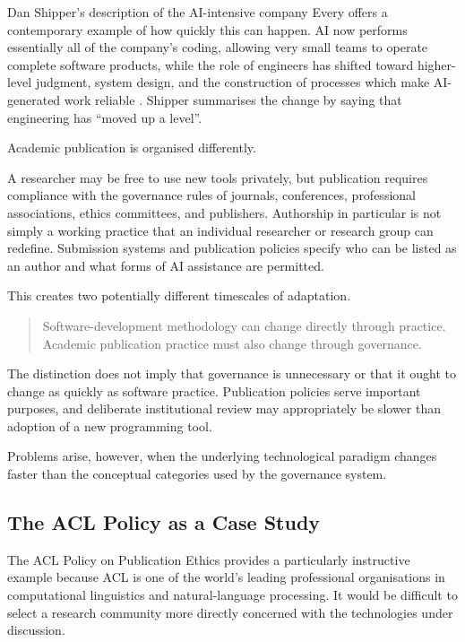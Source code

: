 Dan Shipper's description of the AI-intensive company Every offers a contemporary example of how quickly this can happen. AI now performs essentially all of the company's coding, allowing very small teams to operate complete software products, while the role of engineers has shifted toward higher-level judgment, system design, and the construction of processes which make AI-generated work reliable \citep{newton2026editorclone}. Shipper summarises the change by saying that engineering has ``moved up a level''.

Academic publication is organised differently.

A researcher may be free to use new tools privately, but publication requires compliance with the governance rules of journals, conferences, professional associations, ethics committees, and publishers. Authorship in particular is not simply a working practice that an individual researcher or research group can redefine. Submission systems and publication policies specify who can be listed as an author and what forms of AI assistance are permitted.

This creates two potentially different timescales of adaptation.

\begin{quote}
Software-development methodology can change directly through practice. Academic publication practice must also change through governance.
\end{quote}

The distinction does not imply that governance is unnecessary or that it ought to change as quickly as software practice. Publication policies serve important purposes, and deliberate institutional review may appropriately be slower than adoption of a new programming tool.

Problems arise, however, when the underlying technological paradigm changes faster than the conceptual categories used by the governance system.


\subsection{The ACL Policy as a Case Study}

The ACL Policy on Publication Ethics provides a particularly instructive example because ACL is one of the world's leading professional organisations in computational linguistics and natural-language processing. It would be difficult to select a research community more directly concerned with the technologies under discussion.


